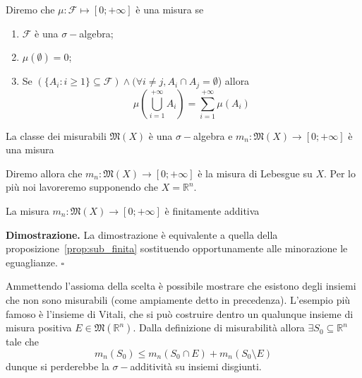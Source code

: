 \begin{definition}[\textcolor{blue}{misura}]
	Diremo che $\mu: \mathcal{F} \mapsto [0; +\infty]$ è una misura se
	\begin{enumerate}[label=\protect\circled{\arabic*}]
		\item $\mathcal{F}$ è una $\sigma-$algebra;
		\item $\mu(\emptyset) = 0$;
		\item Se $( \{A_i : i \geq 1 \} \subseteq \mathcal{F}) \wedge (\forall i \neq j, A_i \cap A_j = \emptyset$) allora
		$$
			\mu \left( \bigcup_{i=1}^{+\infty} A_i \right) = \sum_{i=1}^{+\infty} \mu(A_i)
		$$
	\end{enumerate}
\end{definition}
%
\vspace{0.5cm}
\begin{theorem}
	La classe dei misurabili $\mathfrak{M}(X)$ è una $\sigma-$algebra e $m_n:\mathfrak{M}(X) \to [0; +\infty]$ è una misura
\end{theorem}
%
Diremo allora che $m_n: \mathfrak{M}(X) \to [0; +\infty]$ è la misura di Lebesgue su $X$. Per lo più noi lavoreremo supponendo che $X=\mathbb{R}^n$.
%
\vspace{0.5cm}
\begin{prop}
	La misura $m_n: \mathfrak{M}(X) \to [0; +\infty]$ è finitamente additiva
\end{prop}
%
\noindent \textbf{Dimostrazione. }
La dimostrazione è equivalente a quella della proposizione~\ref{prop:sub_finita} sostituendo opportunamente alle minorazione le eguaglianze.
\hfill $\square$
%
\begin{remark}
Ammettendo l'assioma della scelta è possibile mostrare che esistono degli insiemi che non sono misurabili (come ampiamente detto in precedenza). L'esempio più famoso è
l'insieme di Vitali, che si può costruire dentro un qualunque insieme di misura positiva $E \in \mathfrak{M}(\mathbb{R}^n)$. Dalla definizione di misurabilità allora $\exists S_0 \subseteq \mathbb{R}^n$
tale che 
$$
m_n(S_0) \leq m_n(S_0 \cap E) + m_n(S_0 \setminus E)
$$
dunque si perderebbe la $\sigma-$additività su insiemi disgiunti.
\end{remark}
%
\vspace{0.5cm}
